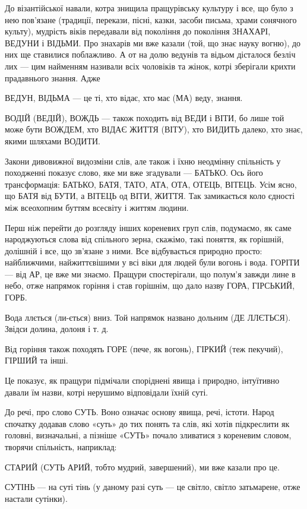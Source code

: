 До візантійської навали, котра знищила пращурівську культуру і все, що було з
нею пов’язане (традиції, перекази, пісні, казки, засоби письма, храми сонячного
культу), мудрість віків передавали від покоління до покоління ЗНАХАРІ, ВЕДУНИ і
ВІДЬМИ. Про знахарів ми вже казали (той, що знає науку вогню), до них ще
ставилися поблажливо. А от на долю ведунів та відьом дісталося безліч лих — цим
найменням називали всіх чоловіків та жінок, котрі зберігали крихти прадавнього
знання. Адже

ВЕДУН, ВІДЬМА — це ті, хто відає, хто має (МА) веду, знання.

ВОДІЙ (ВЕДІЙ), ВОЖДЬ — також походить від ВЕДИ і ВІТИ, бо лише той може бути
ВОЖДЕМ, хто ВІДАЄ ЖИТТЯ (ВІТУ), хто ВИДИТЬ далеко, хто знає, якими шляхами
ВОДИТИ.

Закони дивовижної видозміни слів, але також і їхню неодмінну спільність у
походженні показує слово, яке ми вже згадували — БАТЬКО. Ось його
трансформація: БАТЬКО, БАТЯ, ТАТО, АТА, ОТА, ОТЕЦЬ, ВІТЕЦЬ. Усім ясно, що БАТЯ
від БУТИ, а ВІТЕЦЬ од ВІТИ, ЖИТТЯ. Так замикається коло єдності між всеохопним
буттям всесвіту і життям людини.

Перш ніж перейти до розгляду інших кореневих груп слів, подумаємо, як саме
народжуються слова від спільного зерна, скажімо, такі поняття, як горішній,
долішній і все, що зв’язане з ними. Все відбувається природно просто:
найближчими, найжиттєвішими у всі віки для людей були вогонь і вода. ГОРІТИ —
від АР, це вже ми знаємо. Пращури спостерігали, що полум’я завжди лине в небо,
отже напрямок горіння і став горішнім, що дало назву ГОРА, ГІРСЬКИЙ, ГОРБ.

Вода ллється (ли-ється) вниз. Той напрямок названо дольним (ДЕ ЛЛЄТЬСЯ). Звідси
долина, долоня і т. д.

Від горіння також походять ГОРЕ (пече, як вогонь), ГІРКИЙ (теж пекучий), ГІРШИЙ
та інші.

Це показує, як пращури підмічали споріднені явища і природно, інтуїтивно давали
їм назви, котрі нерушимо відповідали їхній суті.

До речі, про слово СУТЬ. Воно означає основу явища, речі, істоти. Народ
спочатку додавав слово «суть» до тих понять та слів, які хотів підкреслити як
головні, визначальні, а пізніше «СУТЬ» почало зливатися з кореневим словом,
творячи спільність, наприклад:

СТАРИЙ (СУТЬ АРИЙ, тобто мудрий, завершений), ми вже казали про це.

СУТІНЬ — на суті тінь (у даному разі суть — це світло, світло затьмарене, отже
настали сутінки).

